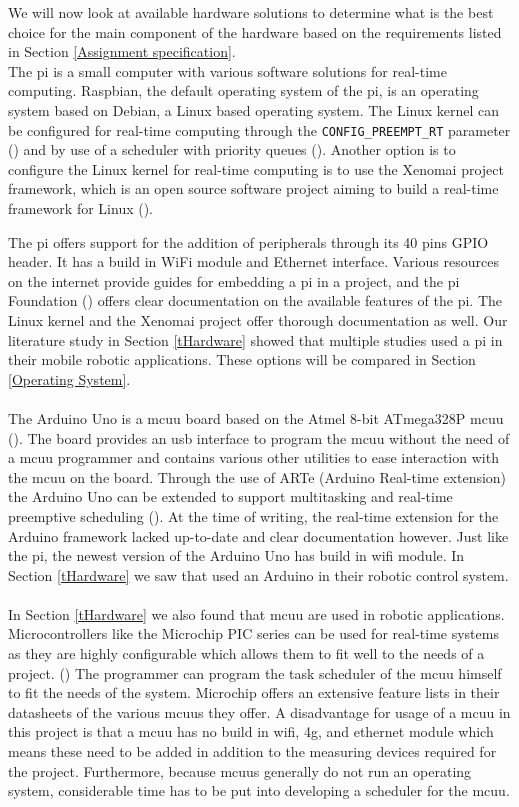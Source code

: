 \documentclass[12pt]{scrreprt}
\begin{document}
We will now look at available hardware solutions to determine what is the best choice for the main component of the hardware based on the requirements listed in Section \ref{Assignment specification}.
\\
The \gls{pi} is a small computer with various software solutions for real-time computing. Raspbian, the default operating system of the \gls{pi}, is an operating system based on Debian, a Linux based operating system. The Linux kernel can be configured for real-time computing through the \texttt{CONFIG_PREEMPT_RT} parameter (\cite{rtwiki}) and by use of a scheduler with priority queues (\cite{linux_scheduling}). Another option is to configure the Linux kernel for real-time computing is to use the Xenomai project framework, which is an open source software project aiming to build a real-time framework for Linux (\cite{xenomai}). 
\par
The \gls{pi} offers support for the addition of peripherals through its 40 pins GPIO header. It has a build in WiFi module and Ethernet interface. Various resources on the internet provide guides for embedding a \gls{pi} in a project, and the \gls{pi} Foundation (\cite{foundation}) offers clear documentation on the available features of the \gls{pi}. The Linux kernel and the Xenomai project offer thorough documentation as well. Our literature study in Section \ref{tHardware} showed that multiple studies used a \gls{pi} in their mobile robotic applications. These options will be compared in Section \ref{Operating System}.
\\\\
The Arduino Uno is a \gls{mcuu} board based on the Atmel 8-bit ATmega328P \gls{mcuu} (\cite{arduinouno}). The board provides an usb interface to program the \gls{mcuu} without the need of a \gls{mcuu} programmer and contains various other utilities to ease interaction with the \gls{mcuu} on the board. Through the use of ARTe (Arduino Real-time extension) the Arduino Uno can be extended to support multitasking and real-time preemptive scheduling (\cite{ARTe}). At the time of writing,  the real-time extension for the Arduino framework lacked up-to-date and clear documentation however. Just like the \gls{pi}, the newest version of the Arduino Uno has build in \gls{wifi} module. In Section \ref{tHardware} we saw that \cite{arduino} used an Arduino in their robotic control system.
\\\\
In Section \ref{tHardware} we also found that \gls{mcuu} are used in robotic applications. Microcontrollers like the Microchip PIC series can be used for real-time systems as they are highly configurable which  allows them to fit well to the needs of a project. (\cite{micro}) The programmer can program the task scheduler of the \gls{mcuu} himself to fit the needs of the system. Microchip offers an extensive feature lists in their datasheets of the various \gls{mcuu}s they offer. A disadvantage for usage of a \gls{mcuu} in this project is that a \gls{mcuu} has no build in \gls{wifi}, \gls{4g}, and ethernet module which means these need to be added in addition to the measuring devices required for the project. Furthermore, because \gls{mcuu}s generally do not run an operating system, considerable time has to be put into developing a scheduler for the \gls{mcuu}.
\end{document}
